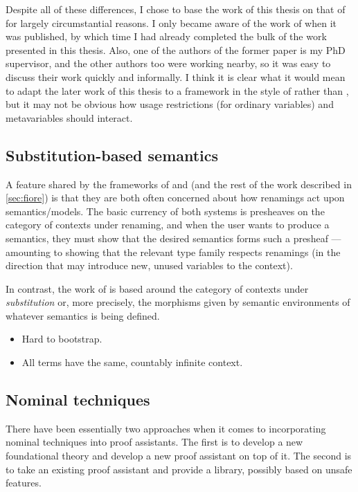 Despite all of these differences,
I chose to base the work of this thesis on that of \citet{AACMM21} for largely
circumstantial reasons.
I only became aware of the work of \citet{FS22} when it was published, by which
time I had already completed the bulk of the work presented in this thesis.
Also, one of the authors of the former paper is my PhD supervisor, and the other
authors too were working nearby, so it was easy to discuss their work quickly
and informally.
I think it is clear what it would mean to adapt the later work of this thesis to
a framework in the style of \citeauthor{FS22} rather than \citeauthor{AACMM21},
but it may not be obvious how usage restrictions (for ordinary variables) and
metavariables should interact.

\subsection{Substitution-based semantics}

A feature shared by the frameworks of \citet{AACMM21} and \citet{FPT99} (and
the rest of the work described in \cref{sec:fiore}) is that they are both often
concerned about how renamings act upon semantics/models.
The basic currency of both systems is presheaves on the category of contexts
under renaming, and when the user wants to produce a semantics, they must show
that the desired semantics forms such a presheaf --- amounting to showing that
the relevant type family respects renamings (in the direction that may introduce
new, unused variables to the context).

In contrast, the work of \citet{HHLM22} is based around the category of contexts
under \emph{substitution} or, more precisely, the morphisms given by semantic
environments of whatever semantics is being defined.

\begin{itemize}
  \item Hard to bootstrap.
  \item All terms have the same, countably infinite context.
\end{itemize}

\subsection{Nominal techniques}

There have been essentially two approaches when it comes to incorporating
nominal techniques into proof assistants.
The first is to develop a new foundational theory and develop a new proof
assistant on top of it.
The second is to take an existing proof assistant and provide a library,
possibly based on unsafe features.

